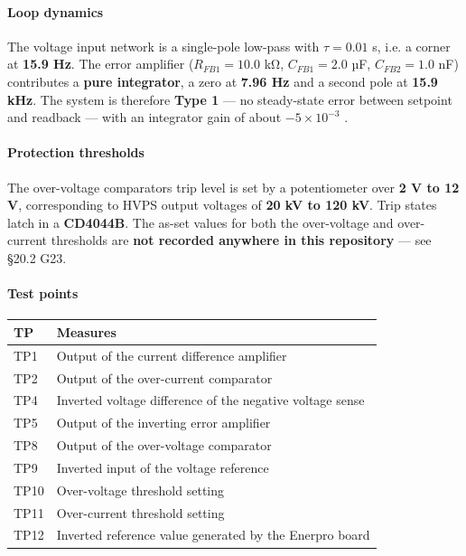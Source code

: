 \paragraph{Loop dynamics}\label{loop-dynamics}

The voltage input network is a single-pole low-pass with \(\tau = 0.01\) s, i.e. a corner at \textbf{15.9 Hz}. The error amplifier (\(R_{FB1} = 10.0\) kΩ, \(C_{FB1} = 2.0\) µF, \(C_{FB2} = 1.0\) nF) contributes a \textbf{pure integrator}, a zero at \textbf{7.96 Hz} and a second pole at \textbf{15.9 kHz}. The system is therefore \textbf{Type 1} --- no steady-state error between setpoint and readback --- with an integrator gain of about \(-5 \times 10^{-3}\) .

\paragraph{Protection thresholds}\label{protection-thresholds}

The over-voltage comparator\textquotesingle s trip level is set by a potentiometer over \textbf{2 V to 12 V}, corresponding to HVPS output voltages of \textbf{20 kV to 120 kV}. Trip states latch in a \textbf{CD4044B}. The as-set values for both the over-voltage and over-current thresholds are \textbf{not recorded anywhere in this repository} --- see §20.2 G23.

\paragraph{Test points}\label{test-points}

\begin{longtable}[]{@{}ll@{}}
\toprule\noalign{}
TP & Measures \\
\midrule\noalign{}
\endhead
\bottomrule\noalign{}
\endlastfoot
TP1 & Output of the current difference amplifier \\
TP2 & Output of the over-current comparator \\
TP4 & Inverted voltage difference of the negative voltage sense \\
TP5 & Output of the inverting error amplifier \\
TP8 & Output of the over-voltage comparator \\
TP9 & Inverted input of the voltage reference \\
TP10 & Over-voltage threshold setting \\
TP11 & Over-current threshold setting \\
TP12 & Inverted reference value generated by the Enerpro board \\
\end{longtable}

